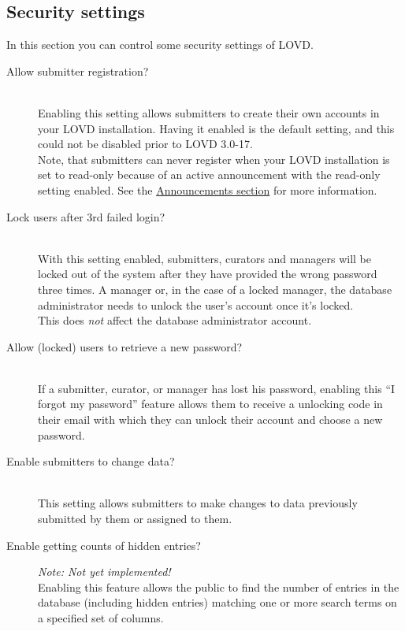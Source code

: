 \hypertarget{ssec:security_settings}{}
\subsection{Security settings}
In this section you can control some security settings of LOVD.
\begin{description}
  \item[Allow submitter registration?] \hfill \\
  Enabling this setting allows submitters to create their own accounts in your LOVD installation.
  Having it enabled is the default setting, and this could not be disabled prior to LOVD 3.0-17.
  \\
  Note, that submitters can never register when your LOVD installation is set to read-only
   because of an active announcement with the read-only setting enabled.
  See the \hyperlink{sec:announcements}{Announcements section} for more information.
  \item[Lock users after 3rd failed login?] \hfill \\
  With this setting enabled, submitters, curators and managers will be locked out
   of the system after they have provided the wrong password three times.
  A manager or, in the case of a locked manager, the database administrator
   needs to unlock the user's account once it's locked.
  \\
  This does \emph{not} affect the database administrator account.
  \item[Allow (locked) users to retrieve a new password?] \hfill \\
  If a submitter, curator, or manager has lost his password, enabling this ``I forgot my password''
   feature allows them to receive a unlocking code in their email with which
    they can unlock their account and choose a new password.
  \item[Enable submitters to change data?] \hfill \\
  This setting allows submitters to make changes to data previously submitted by them or assigned to them.
  \item[Enable getting counts of hidden entries?] \hfill \par
  \emph{Note: Not yet implemented!}
  \\
  Enabling this feature allows the public to find the number of entries in the database
   (including hidden entries) matching one or more search terms on a specified set of columns.

\end{description}
